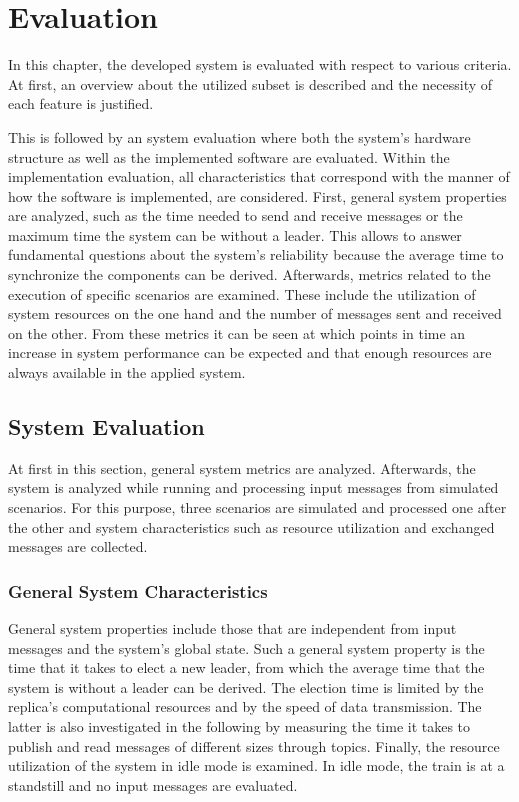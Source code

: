 \chapter{Evaluation}
\label{cpt:evaluation}
In this chapter, the developed system is evaluated with respect to various criteria.
At first, an overview about the utilized  subset is described and the necessity of each feature is justified.

This is followed by an system evaluation where both the system's hardware structure as well as the implemented software are evaluated.
Within the implementation evaluation, all characteristics that correspond with the manner of how the software is implemented, are considered.
First, general system properties are analyzed, such as the time needed to send and receive messages or the maximum time the system can be without a leader.
This allows to answer fundamental questions about the system's reliability because the average time to synchronize the components can be derived.
Afterwards, metrics related to the execution of specific scenarios are examined.
These include the utilization of system resources on the one hand and the number of messages sent and received on the other.
From these metrics it can be seen at which points in time an increase in system performance can be expected and that enough resources are always available in the applied system.

\section{System Evaluation}
At first in this section, general system metrics are analyzed.
Afterwards, the system is analyzed while running and processing input messages from simulated scenarios.
For this purpose, three scenarios are simulated and processed one after the other and system characteristics such as resource utilization and exchanged messages are collected.

\subsection{General System Characteristics}
General system properties include those that are independent from input messages and the system's global state.
Such a general system property is the time that it takes to elect a new leader, from which the average time that the system is without a leader can be derived.
The election time is limited by the replica's computational resources and by the speed of data transmission.
The latter is also investigated in the following by measuring the time it takes to publish and read messages of different sizes through  topics.
Finally, the resource utilization of the system in idle mode is examined.
In idle mode, the train is at a standstill and no input messages are evaluated.

